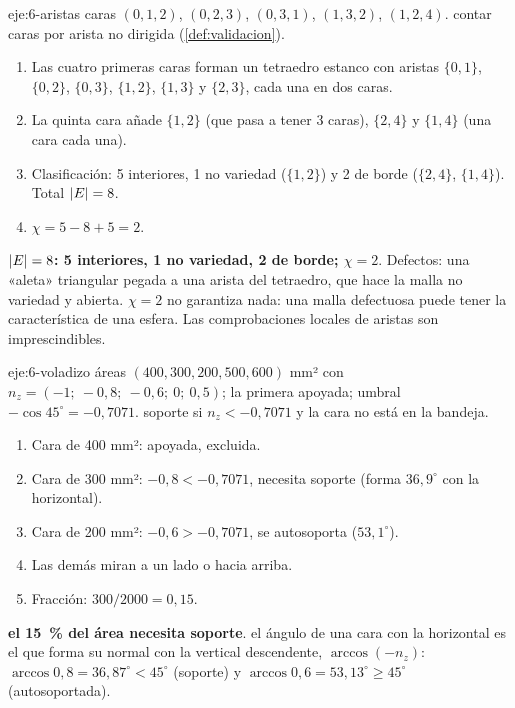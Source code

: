 \begin{solucion}{eje:6-aristas}
\datos caras $(0,1,2)$, $(0,2,3)$, $(0,3,1)$, $(1,3,2)$, $(1,2,4)$.
\planteamiento contar caras por arista no dirigida (\cref{def:validacion}).
\pasos
\begin{enumerate}[label=\arabic*.]
  \item Las cuatro primeras caras forman un tetraedro estanco con aristas $\{0,1\}$, $\{0,2\}$, $\{0,3\}$, $\{1,2\}$, $\{1,3\}$ y $\{2,3\}$, cada una en dos caras.
  \item La quinta cara añade $\{1,2\}$ (que pasa a tener 3 caras), $\{2,4\}$ y $\{1,4\}$ (una cara cada una).
  \item Clasificación: 5 interiores, 1 no variedad ($\{1,2\}$) y 2 de borde ($\{2,4\}$, $\{1,4\}$). Total $\lvert E\rvert=8$.
  \item $\chi=5-8+5=2$.
\end{enumerate}
\resultado \textbf{$\lvert E\rvert=8$: 5 interiores, 1 no variedad, 2 de borde; $\chi=2$}. Defectos: una «aleta» triangular pegada a una arista del tetraedro, que hace la malla no variedad y abierta.
\comprobacion $\chi=2$ no garantiza nada: una malla defectuosa puede tener la característica de una esfera. Las comprobaciones locales de aristas son imprescindibles.
\end{solucion}

\begin{solucion}{eje:6-voladizo}
\datos áreas $(400,300,200,500,600)$ mm² con $n_z=(-1;\ -0{,}8;\ -0{,}6;\ 0;\ 0{,}5)$; la primera apoyada; umbral $-\cos 45^\circ=-0{,}7071$.
\planteamiento soporte si $n_z<-0{,}7071$ y la cara no está en la bandeja.
\pasos
\begin{enumerate}[label=\arabic*.]
  \item Cara de 400 mm²: apoyada, excluida.
  \item Cara de 300 mm²: $-0{,}8<-0{,}7071$, necesita soporte (forma $36{,}9^\circ$ con la horizontal).
  \item Cara de 200 mm²: $-0{,}6>-0{,}7071$, se autosoporta ($53{,}1^\circ$).
  \item Las demás miran a un lado o hacia arriba.
  \item Fracción: $300/2000=0{,}15$.
\end{enumerate}
\resultado \textbf{el 15~\% del área necesita soporte}.
\comprobacion el ángulo de una cara con la horizontal es el que forma su normal con la vertical descendente, $\arccos(-n_z)$: $\arccos 0{,}8=36{,}87^\circ<45^\circ$ (soporte) y $\arccos 0{,}6=53{,}13^\circ\ge 45^\circ$ (autosoportada).
\end{solucion}

